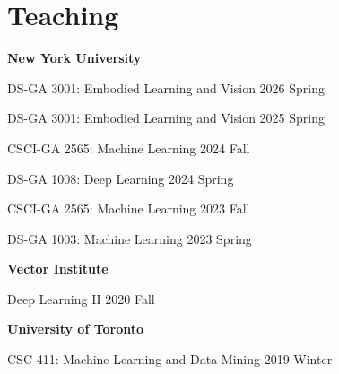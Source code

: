 
\if{}
\else
\section{\sc Teaching}
{\bf New York University}
\begin{list2}
\item DS-GA 3001: Embodied Learning and Vision \hfill 2026 Spring
\item DS-GA 3001: Embodied Learning and Vision \hfill 2025 Spring
\item CSCI-GA 2565: Machine Learning \hfill 2024 Fall
\item DS-GA 1008: Deep Learning \hfill 2024 Spring
\item CSCI-GA 2565: Machine Learning \hfill 2023 Fall
\item DS-GA 1003: Machine Learning \hfill 2023 Spring
\end{list2}
{\bf Vector Institute}
\begin{list2}
\item Deep Learning II \hfill 2020 Fall
\end{list2}
{\bf University of Toronto}
\begin{list2}
\item CSC 411: Machine Learning and Data Mining \hfill 2019 Winter
\end{list2}
\fi

